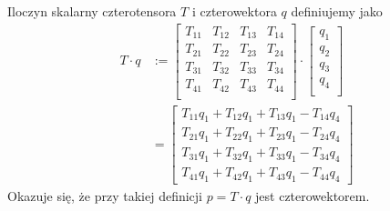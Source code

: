 \documentclass[../main.tex]{subfiles}
\begin{document}
Iloczyn skalarny czterotensora \(T\) i czterowektora \(q\) definiujemy jako
\begin{equation*}
\begin{split}
    T\cdot q&:=\left[\begin{array}{cccc}
         T_{11}&T_{12}&T_{13}&T_{14}  \\
         T_{21}&T_{22}&T_{23}&T_{24}  \\
         T_{31}&T_{32}&T_{33}&T_{34}  \\
         T_{41}&T_{42}&T_{43}&T_{44}  \\
    \end{array}\right]\cdot\left[\begin{array}{c}
         q_1  \\
         q_2  \\
         q_3  \\
         q_4  \\
    \end{array}\right]\\
    &=\left[\begin{array}{c}
         T_{11}q_1+T_{12}q_1+T_{13}q_1-T_{14}q_4 \\
         T_{21}q_1+T_{22}q_1+T_{23}q_1-T_{24}q_4 \\
         T_{31}q_1+T_{32}q_1+T_{33}q_1-T_{34}q_4 \\
         T_{41}q_1+T_{42}q_1+T_{43}q_1-T_{44}q_4  
    \end{array}\right]
\end{split}
\end{equation*}
Okazuje się, że przy takiej definicji \(p=T\cdot q\) jest czterowektorem.
\end{document}
